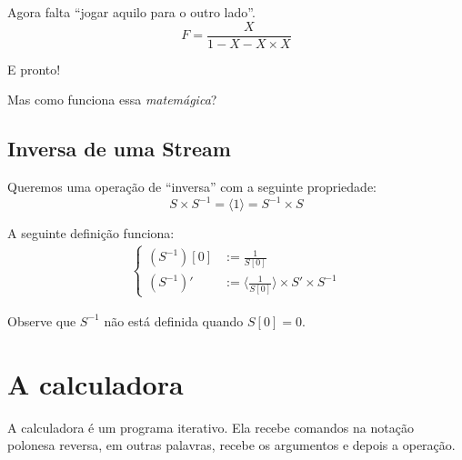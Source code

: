 \documentclass{article}
\newcommand{\note}[1]{\textbf{Nota:} \textit{#1}}
\newcommand{\ins}[1]{\langle #1 \rangle}
\newcommand{\inv}[1]{{#1}^{-1}}
\begin{document}
Agora falta ``jogar aquilo para o outro lado''.
\[
    F = \frac{X}{1 - X - X \times X}
\]

E pronto!

Mas como funciona essa \emph{matemágica}?

\subsection{Inversa de uma Stream}

Queremos uma operação de ``inversa''
com a seguinte propriedade:
\[
    S \times \inv{S} = \ins{1} = \inv{S} \times S
\]

A seguinte definição funciona:
\begin{align*} \begin{cases}
    (\inv{S})[0] &:= \frac{1}{S[0]} \\
    (\inv{S})'   &:= \ins{\frac{1}{S[0]}} \times S' \times \inv{S}
\end{cases} \end{align*}

Observe que \(\inv{S}\) não está definida
quando \(S[0] = 0\).

\iffalse
\section{Streams Racionais}

Com isso completamos o que precisamos para
definir \textbf{Streams Racionais}.

Uma \textbf{Stream Racional} \(A^\omega\) é uma generalização
da \textbf{Streams de Números} da seção anterior,
podemos:
\begin{itemize}
    \item Somar
    \item Multiplicar
    \item Inverter
\end{itemize}
\note{Genericamente só pedimos que \(A\) forme um Corpo.}

\subsection{Circuitos}
\fi

\section{A calculadora}

A calculadora é um programa iterativo.
Ela recebe comandos na notação polonesa reversa,
em outras palavras,
recebe os argumentos e depois a operação.
\end{document}
